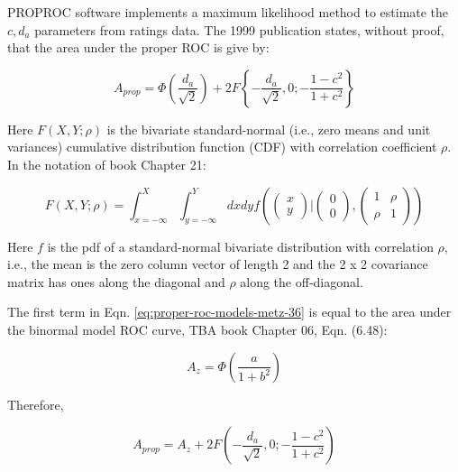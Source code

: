 \documentclass[
]{book}
\begin{document}
PROPROC software implements a maximum likelihood method to estimate the \(c, d_a\) parameters from ratings data. The 1999 publication \citep{metz1999proper} states, without proof, that the area under the proper ROC is give by:

\begin{equation} 
A_{prop}=\Phi\left( \frac{d_a}{\sqrt{2}} \right) + 2F\left\{-\frac{d_a}{\sqrt{2}},0;-\frac{1-c^2}{1+c^2}  \right\}
\label{eq:proper-roc-models-metz-36}
\end{equation}

Here \(F(X,Y;\rho)\) is the bivariate standard-normal (i.e., zero means and unit variances) cumulative distribution function (CDF) with correlation coefficient \(\rho\). In the notation of book Chapter 21:

\begin{equation} 
F\left( X,Y;\rho \right)=\int_{x=-\infty}^{X}
\int_{y=-\infty}^{Y}
dx dy f\left( 
\left( \begin{matrix}
x \\
y
\end{matrix}
 \right) \bigg\rvert
\left( \begin{matrix}
0 \\
0
\end{matrix}  \right),
\left( \begin{matrix}
1 & \rho \\
\rho & 1
\end{matrix} \right)
\right)
\label{eq:proper-roc-models-def-bivariate-cdf}
\end{equation}

Here \(f\) is the pdf of a standard-normal bivariate distribution with correlation \(\rho\), i.e., the mean is the zero column vector of length 2 and the 2 x 2 covariance matrix has ones along the diagonal and \(\rho\) along the off-diagonal.

The first term in Eqn. \eqref{eq:proper-roc-models-metz-36} is equal to the area under the binormal model ROC curve, TBA book Chapter 06, Eqn. (6.48):

\begin{equation} 
A_z=\Phi\left( \frac{a}{1+b^2} \right)
\label{eq:proper-roc-models-az-binormal}
\end{equation}

Therefore,

\begin{equation} 
A_{prop}=A_z+2F\left( -\frac{d_a}{\sqrt{2}},0;-\frac{1-c^2}{1+c^2} \right)
\label{eq:proper-roc-models-area-proproc2}
\end{equation}
\end{document}
